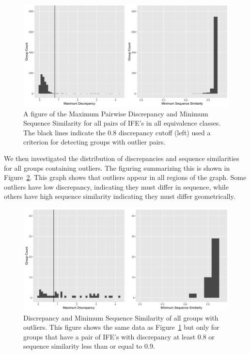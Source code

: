 \begin{figure}[h]
  \includegraphics[width=\textwidth]{chapter-3/figs/eq-summary}
  \caption{A figure of the Maximum Pairwise Discrepancy and Minimum Sequence
    Similarity for all pairs of IFE's in all equivalence classes. The black
    lines indicate the 0.8 discrepancy cutoff (left) used a criterion for
  detecting groups with outlier pairs.}
  \label{fig:eq-summary}
\end{figure}

We then investigated the distribution of discrepancies and sequence similarities
for all groups containing outliers. The figuring summarizing this is shown in
Figure~\ref{fig:eq-outlier-summary}. This graph shows that outliers appear in all regions of
the graph. Some outliers have low discrepancy, indicating they must differ in
sequence, while others have high sequence similarity indicating they must differ
geometrically.

\begin{figure}[h]
  \includegraphics[width=\textwidth]{chapter-3/figs/outlier-summary}
  \caption{Discrepancy and Minimum Sequence Similarity of all groups with
  outliers. This figure shows the same data as Figure~\ref{fig:eq-summary} but
only for groups that have a pair of IFE's with discrepancy at least 0.8 or
sequence similarity less than or equal to 0.9.}
  \label{fig:eq-outlier-summary}
\end{figure}

